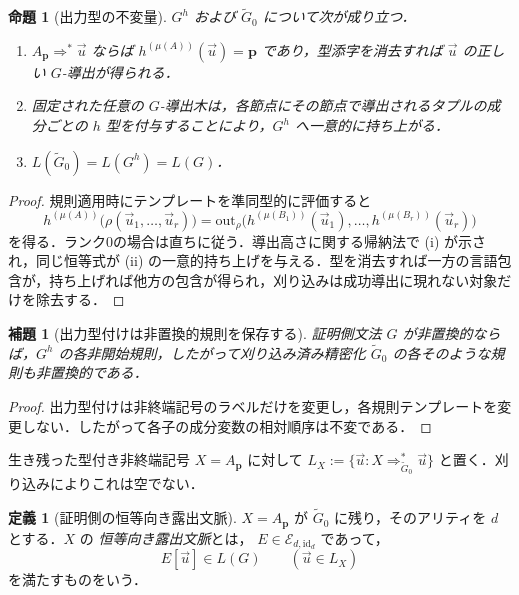 \documentclass[11pt,a4paper]{ltjsarticle}
\numberwithin{equation}{section}
\theoremstyle{plain}
\newtheorem{lemma}[theorem]{補題}
\newtheorem{proposition}[theorem]{命題}
\theoremstyle{definition}
\newtheorem{definition}[theorem]{定義}
\theoremstyle{remark}
\newcommand{\out}{\mathrm{out}}
\newcommand{\tuple}[1]{\vec{#1}}
\begin{document}
\begin{proposition}[出力型の不変量]
\label{prop:output-invariants}
\(G^h\) および \(\widetilde G_0\) について次が成り立つ．
\begin{enumerate}[label=(\roman*),leftmargin=*]
\item \(A_{\mathbf p}\Rightarrow^*\tuple u\) ならば
\(h^{(\mu(A))}(\tuple u)=\mathbf p\) であり，型添字を消去すれば \(\tuple u\) の正しい \(G\)-導出が得られる．
\item 固定された任意の \(G\)-導出木は，各節点にその節点で導出されるタプルの成分ごとの \(h\) 型を付与することにより，\(G^h\) へ一意的に持ち上がる．
\item \(L(\widetilde G_0)=L(G^h)=L(G)\)．
\end{enumerate}
\end{proposition}

\begin{proof}
規則適用時にテンプレートを準同型的に評価すると
\[
  h^{(\mu(A))}
  \bigl(\rho(\tuple u_1,\ldots,\tuple u_r)\bigr)
  =
  \out_\rho
  \bigl(h^{(\mu(B_1))}(\tuple u_1),\ldots,
        h^{(\mu(B_r))}(\tuple u_r)\bigr)
\]
を得る．ランク0の場合は直ちに従う．導出高さに関する帰納法で (i) が示され，同じ恒等式が (ii) の一意的持ち上げを与える．型を消去すれば一方の言語包含が，持ち上げれば他方の包含が得られ，刈り込みは成功導出に現れない対象だけを除去する．
\end{proof}

\begin{lemma}[出力型付けは非置換的規則を保存する]
\label{lem:refinement-nonpermuting}
証明側文法 \(G\) が非置換的ならば，\(G^h\) の各非開始規則，したがって刈り込み済み精密化 \(\widetilde G_0\) の各そのような規則も非置換的である．
\end{lemma}

\begin{proof}
出力型付けは非終端記号のラベルだけを変更し，各規則テンプレートを変更しない．したがって各子の成分変数の相対順序は不変である．
\end{proof}

生き残った型付き非終端記号 \(X=A_{\mathbf p}\) に対して
\(L_X:=\{\tuple u:X\Rightarrow_{\widetilde G_0}^*\tuple u\}\)
と置く．刈り込みによりこれは空でない．

\begin{definition}[証明側の恒等向き露出文脈]
\label{def:identity-exposing-context}
\(X=A_{\mathbf p}\) が \(\widetilde G_0\) に残り，そのアリティを \(d\) とする．\(X\) の \emph{恒等向き露出文脈}とは，
\(E\in\mathcal E_{d,\mathrm{id}_d}\) であって，
\[
  E[\tuple u]\in L(G)
  \qquad(\tuple u\in L_X)
\]
を満たすものをいう．
\end{definition}
\end{document}

